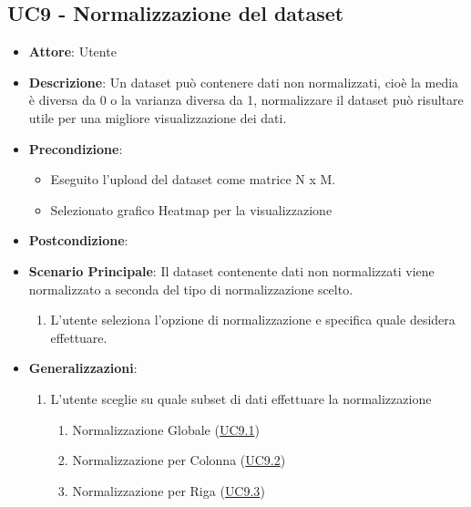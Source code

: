     \subsection{UC9 - Normalizzazione del dataset}
    \begin{itemize}
    \item \textbf{Attore}: Utente
    \item \textbf{Descrizione}: Un dataset può contenere dati non normalizzati, cioè la media è diversa da 0 o la varianza diversa da 1, normalizzare il dataset può risultare utile per una migliore visualizzazione dei dati.
    \item \textbf{Precondizione}: 
    \begin{itemize}
        \item Eseguito l'upload del dataset come matrice N x M.
        \item Selezionato grafico Heatmap per la visualizzazione
    \end{itemize}  
    \item \textbf{Postcondizione}: 
    \item \textbf{Scenario Principale}: Il dataset contenente dati non normalizzati viene normalizzato a seconda del tipo di normalizzazione scelto.
    \begin{enumerate}
        \item L'utente seleziona l'opzione di normalizzazione e specifica quale desidera effettuare.
    \end{enumerate}  
    \item \textbf{Generalizzazioni}: 
     \begin{enumerate}
            \item L'utente sceglie su quale subset di dati effettuare la normalizzazione
                \begin{enumerate}
                    \item Normalizzazione Globale (\hyperref[uc9.1]{UC9.1})
                    \item Normalizzazione per Colonna (\hyperref[uc9.2]{UC9.2})
                    \item Normalizzazione per Riga (\hyperref[uc9.3]{UC9.3})
                \end{enumerate}
        \end{enumerate}  
    \end{itemize}
    
